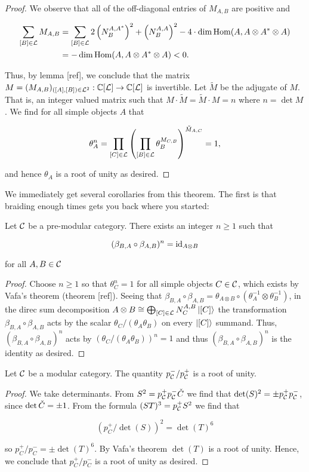 \begin{proof}
We observe that all of the off-diagonal entries of $M_{A,B}$ are positive and

\begin{align*}
\sum_{[B]\in {\mathcal L}}M_{A,B} &=\sum_{[B]\in {\mathcal L}}2\left(N^{A,A^*}_{B}\right)^2+\left(N^{A,A}_{B}\right)^2 - 4\cdot \dim \operatorname{Hom}(A,A\otimes A^*\otimes A)\\
&=  -\dim \operatorname{Hom}(A,A\otimes A^*\otimes A)<0.
\end{align*}

Thus, by lemma [ref], we conclude that the matrix $M=(M_{A,B})_{([A],[B])\in {\mathcal L}^2}: {\mathbb C}[{\mathcal L}]\to{\mathbb C}[{\mathcal L}]$ is invertible. Let $\tilde{M}$ be the adjugate of $M$. That is, an integer valued matrix such that $M\cdot \tilde{M}=\tilde{M}\cdot M = n$ where $n=\det M$. We find for all simple objects $A$ that

$$\theta_{A}^n=\prod_{[C]\in {\mathcal L}}\left(\prod_{[B]\in {\mathcal L}}\theta_{B}^{M_{C,B}}\right)^{\tilde{M}_{A,C}}=1,$$

and hence $\theta_{A}$ is a root of unity as desired.

\end{proof}


We immediately get several corollaries from this theorem. The first is that braiding enough times gets you back where you started:

\begin{cor} Let ${\mathcal C}$ be a pre-modular category. There exists an integer $n\geq 1$ such that

$$(\beta_{B,A}\circ \beta_{A,B})^{n}=\operatorname{id}_{A\otimes B}$$

for all $A,B\in {\mathcal C}$

\end{cor}
\begin{proof} Choose $n\geq 1$ so that $\theta_{C}^n=1$ for all simple objects $C\in {\mathcal C}$, which exists by Vafa's theorem (theorem [ref]). Seeing that $\beta_{B,A}\circ \beta_{A,B}=\theta_{A\otimes B}\circ (\theta_{A}^{-1}\otimes \theta_{B}^{-1})$, in the direc sum decomposition $A\otimes B \cong \bigoplus_{[C]\in {\mathcal L}}N^{A,B}_{C}\ket{[C]}$ the transformation $\beta_{B,A}\circ \beta_{A,B}$ acts by the scalar $\theta_{C}/(\theta_{A}\theta_{B})$ on every $\ket{[C]}$ summand. Thus, $(\beta_{B,A}\circ \beta_{A,B})^n$ acts by $(\theta_{C}/(\theta_{A}\theta_{B}))^n=1$ and thus $(\beta_{B,A}\circ \beta_{A,B})^n$ is the identity as desired.
\end{proof}

\begin{cor} Let ${\mathcal C}$ be a modular category. The quantity $p_{{\mathcal C}}^-/p_{{\mathcal C}}^+$ is a root of unity.
\end{cor}
\begin{proof} We take determinants. From $S^2= p^{+}_{{\mathcal C}}p^{-}_{{\mathcal C}}{\check C}$ we find that $\det(S)^2=\pm p_{{\mathcal C}}^+p_{{\mathcal C}}^-$, since $\det {\check C} = \pm 1$. From the formula $(ST)^3=p^{+}_{{\mathcal C}}S^2$ we find that

$$\left(p^{+}_C/\det(S)\right)^2=\det(T)^6$$

so $p^{+}_C/p^{-}_{C}=\pm \det(T)^6$. By Vafa's theorem $\det(T)$ is a root of unity. Hence, we conclude that $p^{+}_C/p^{-}_{C}$ is a root of unity as desired.
\end{proof}

